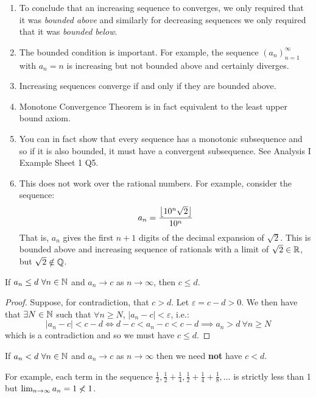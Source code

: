 \documentclass[../main.tex]{subfiles}
\begin{document}
\begin{remark}
  \begin{enumerate}
    \item To conclude that an increasing sequence to converges, we only required that it was \textit{bounded above} and similarly for decreasing sequences we only required that it was \textit{bounded below}.
    \item The bounded condition is important. For example, the sequence $(a_n)^{\infty}_{n=1}$ with $a_n = n$ is increasing but not bounded above and certainly diverges.
    \item Increasing sequences converge if and only if they are bounded above.
    \item Monotone Convergence Theorem is in fact equivalent to the least upper bound axiom.
    \item You can in fact show that every sequence has a monotonic subsequence and so if it is also bounded, it must have a convergent subsequence.
      See Analysis I Example Sheet 1 Q5.
    \item This does not work over the rational numbers.
      For example, consider the sequence:
      \[
        a_n = \frac{\left\lfloor 10^{n}\sqrt{2} \right\rfloor}{10^{n}}
      \]
      That is, $a_n$ gives the first $n + 1$ digits of the decimal expansion of $\sqrt{2}$.
      This is bounded above and increasing sequence of rationals with a limit of $\sqrt{2} \in \mathbb{R}$, but $\sqrt{2} \notin \mathbb{Q}$.
  \end{enumerate}
\end{remark}
\begin{proposition}
  If $a_n \leq d\ \forall n \in \mathbb{N}$ and $a_n \to c$ as $n \to \infty$, then $c \leq d$.
\end{proposition}
\begin{proof}
  Suppose, for contradiction, that $c > d$.
  Let $\varepsilon = c - d > 0$.
  We then have that $\exists N \in \mathbb{N}$ such that $\forall n \geq N$, $|a_n - c| < \varepsilon$, i.e.:
  \[
    |a_n - c| < c - d \iff d - c < a_n - c < c - d \implies a_n > d\ \forall n \geq N
  \]
  which is a contradiction and so we must have $c \leq d$.
\end{proof}
\begin{remark}[Warning]
  If $a_n < d\ \forall n \in \mathbb{N}$ and $a_n \to c$ as $n \to \infty$ then we need \textbf{not} have $c < d$.

  For example, each term in the sequence $\frac{1}{2}, \frac{1}{2} + \frac{1}{4}, \frac{1}{2} + \frac{1}{4} + \frac{1}{8}, \ldots$ is strictly less than 1 but $\lim_{n \to \infty} a_n = 1 \centernot< 1$.
\end{remark}
\end{document}
